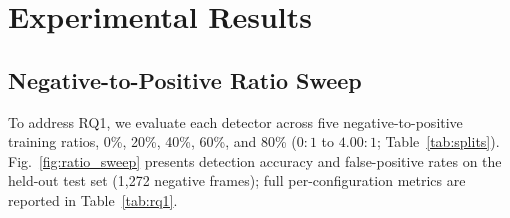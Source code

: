 \documentclass[conference]{IEEEtran}
\begin{document}
\section{Experimental Results}

\subsection{Negative-to-Positive Ratio Sweep}
\label{subsec:results_ratio}
To address RQ1, we evaluate each detector across five negative-to-positive training ratios, 0\%, 20\%, 40\%, 60\%, and 80\% ($0{:}1$ to $4.00{:}1$; Table~\ref{tab:splits}). Fig.~\ref{fig:ratio_sweep} presents detection accuracy and false-positive rates on the held-out test set (1,272 negative frames); full per-configuration metrics are reported in Table~\ref{tab:rq1}.
\end{document}
